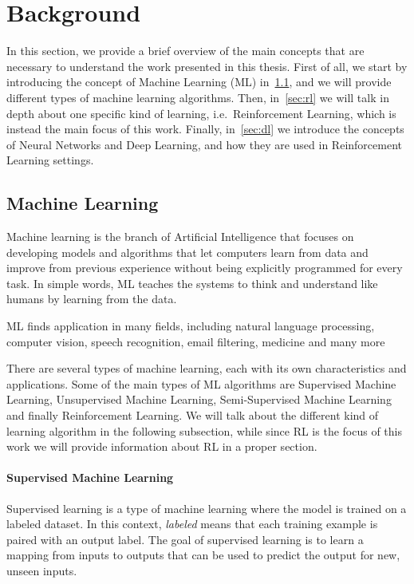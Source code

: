 
\chapter{Background}
\label{sec:background}
In this section, we provide a brief overview of the main concepts that are necessary to understand the work presented in this thesis.
First of all, we start by introducing the concept of Machine Learning (ML) in~\ref{sec:machine_learning}, and we will provide different types of machine learning algorithms.
Then, in~\ref{sec:rl} we will talk in depth about one specific kind of learning, i.e.\ Reinforcement Learning, which is instead the main focus of this work.
Finally, in~\ref{sec:dl} we introduce the concepts of Neural Networks and Deep Learning, and how they are used in Reinforcement Learning settings.

\section{Machine Learning}
\label{sec:machine_learning}

Machine learning is the branch of Artificial Intelligence that focuses on developing models and algorithms that let computers learn from data and improve from previous experience without being explicitly programmed for every task.
In simple words, ML teaches the systems to think and understand like humans by learning from the data.

ML finds application in many fields, including natural language processing, computer vision, speech recognition, email filtering, medicine and many more

There are several types of machine learning, each with its own characteristics and applications.
Some of the main types of ML algorithms are Supervised Machine Learning, Unsupervised Machine Learning, Semi-Supervised Machine Learning and finally Reinforcement Learning.
We will talk about the different kind of learning algorithm in the following subsection, while since RL is the focus of this work we will provide information about RL in a proper section.

\subsubsection{Supervised Machine Learning}
\label{subsubsec:supervised_ml}
Supervised learning is a type of machine learning where the model is trained on a labeled dataset.
In this context, \textit{labeled} means that each training example is paired with an output label.
The goal of supervised learning is to learn a mapping from inputs to outputs that can be used to predict the output for new, unseen inputs.



